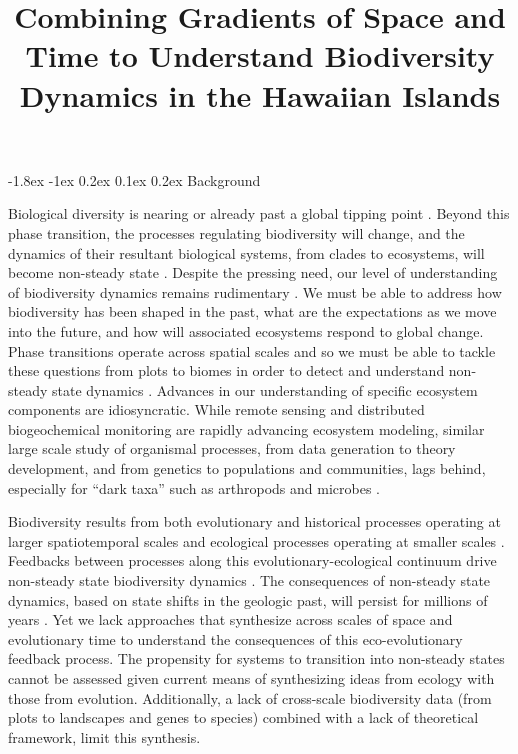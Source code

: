\documentclass[11pt]{article}
\title{Combining Gradients of Space and Time to Understand
  Biodiversity Dynamics in the Hawaiian Islands \vspace{-1.5ex}}
\author{}
\date{}
\makeatletter
\renewcommand\section{\@startsection{section}{1}{\z@}%
                                  {-1.8ex \@plus -1ex \@minus 0.2ex}%
                                  {0.1ex \@plus 0.2ex}%
                                  {\normalfont\Large\bfseries}}
\makeatother
\begin{document}
\maketitle
\thispagestyle{fancy} 
\vspace{-4em}

%
%

\section{Background}

Biological diversity is nearing or already past a global tipping point
\citep{barnosky2012}. Beyond this phase transition, the processes
regulating biodiversity will change, and the dynamics of their
resultant biological systems, from clades to ecosystems, will become
non-steady state \citep{barnosky2012}.  Despite the pressing need, our
level of understanding of biodiversity dynamics remains rudimentary .
We must be able to address how biodiversity has been shaped in the
past, what are the expectations as we move into the future, and how
will associated ecosystems respond to global change. Phase transitions
operate across spatial scales and so we must be able to tackle these
questions from plots to biomes in order to detect and understand
non-steady state dynamics \citep{heffernan2014, soranno2014}. Advances
in our understanding of specific ecosystem components are
idiosyncratic.  While remote sensing and distributed biogeochemical
monitoring \citep{asner2012, NEON} are rapidly advancing ecosystem
modeling, similar large scale study of organismal processes, from data
generation to theory development, and from genetics to populations and
communities, lags behind, especially for ``dark taxa'' such as
arthropods and microbes \citep{levy2014}.

Biodiversity results from both evolutionary and historical processes
operating at larger spatiotemporal scales and ecological processes
operating at smaller scales \citep{lessard2012}.  Feedbacks between
processes along this evolutionary-ecological continuum drive
non-steady state biodiversity dynamics \citep{brown1971,
  ricklefs2006neutral, rominger2015}. The consequences of non-steady
state dynamics, based on state shifts in the geologic past, will
persist for millions of years \citep{Erwin1998}. Yet we lack
approaches that synthesize across scales of space and evolutionary
time to understand the consequences of this eco-evolutionary feedback
process.  The propensity for systems to transition into non-steady
states cannot be assessed given current means of synthesizing ideas
from ecology with those from evolution.  Additionally, a lack of
cross-scale biodiversity data (from plots to landscapes and genes to
species) combined with a lack of theoretical framework, limit this
synthesis.
\end{document}
